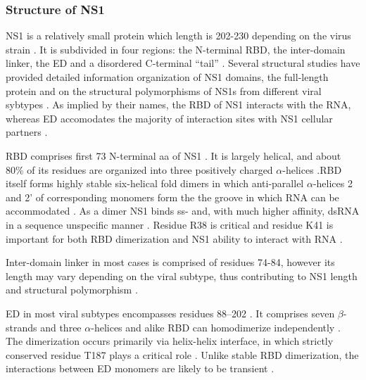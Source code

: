 		
		\subsubsection{Structure of NS1}
		
		\gls{NS1} is a relatively small protein which length is 202-230 depending on the virus strain \parencite{Hale2008b}. It is subdivided in four regions: the N-terminal \gls{RBD}, the inter-domain linker, the \gls{ED} and a disordered C-terminal ``tail'' \parencite{Hale2014}. Several structural studies have provided detailed information organization of \gls{NS1} domains, the full-length protein and on the structural polymorphisms of \gls{NS1}s from different viral sybtypes \parencite{Chien1997, Liu1997a, Wang1999a, Bornholdt2006, Yin2007a, Hale2008c, Cheng2009, Xia2009, Kerry2011, Carrillo2014}. As implied by their names, the \gls{RBD} of NS1 interacts with the RNA, whereas \gls{ED} accomodates the majority of interaction sites with \gls{NS1} cellular partners \parencite{Hale2008b}.
		
		\gls{RBD} comprises first 73 N-terminal aa of \gls{NS1} \parencite{Qian1995a, Yin2007a}. It is largely helical, and about 80\% of its residues are organized into three positively charged $\alpha$-helices \parencite{Qian1995a, Liu1997a}.\gls{RBD} itself forms highly stable six-helical fold dimers in which anti-parallel $\alpha$-helices 2 and 2' of corresponding monomers form the the groove in which RNA can be accommodated \parencite{Chien1997, Wang1999a}. As a dimer NS1 binds ss- and, with much higher affinity, dsRNA in a sequence unspecific manner \parencite{Hatada1992, Chien1997, Qian1995}. Residue R38 is critical and residue K41 is important for both \gls{RBD} dimerization and \gls{NS1} ability to interact with RNA \parencite{Hatada1992, Wang1999a}.
		
		Inter-domain linker in most cases is comprised of residues 74-84, however its length may vary depending on the viral subtype, thus contributing to \gls{NS1} length and structural polymorphism \parencite{Bornholdt2006, Carrillo2014, Kerry2011}.
		
		\gls{ED} in most viral subtypes encompasses residues 88--202 \parencite{Hale2014}. It comprises seven $\beta$-strands and three $\alpha$-helices and alike \gls{RBD} can homodimerize independently \parencite{Bornholdt2006, Hale2008c, Xia2009}. The dimerization occurs primarily via helix-helix interface, in which strictly conserved residue T187 plays a critical role \parencite{Hale2008c, Kerry2011}. Unlike stable \gls{RBD} dimerization, the interactions between \gls{ED} monomers are likely to be transient \parencite{Kerry2011, Hale2014}.
		
